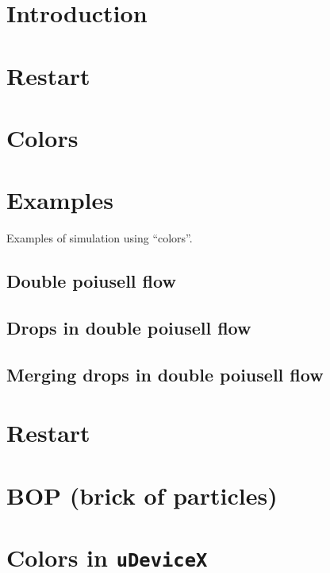 \documentclass{article}
\begin{document}
\maketitle

\section{Introduction}


\section{Restart}


\section{Colors}


\section{Examples}
Examples of simulation using ``colors''.

\subsection{Double poiusell flow}


\subsection{Drops in double poiusell flow}


\subsection{Merging drops in double poiusell flow}


\appendix
\section{Restart}\label{a:restart}


\section{BOP (brick of particles)}\label{a:bop}


\section{Colors in \texttt{uDeviceX}}\label{a:color}

\end{document}
